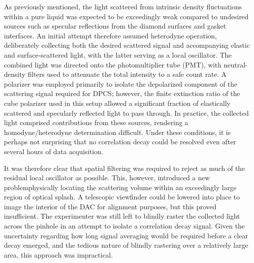 As previously mentioned, the light scattered from intrinsic density fluctuations within a pure liquid was expected to be exceedingly weak compared to undesired sources such as specular reflections from the diamond surfaces and gasket interfaces. An initial attempt therefore assumed heterodyne operation, deliberately collecting both the desired scattered signal and accompanying elastic and surface-scattered light, with the latter serving as a local oscillator. The combined light was directed onto the photomultiplier tube (PMT), with neutral-density filters used to attenuate the total intensity to a safe count rate. A polarizer was employed primarily to isolate the depolarized component of the scattering signal required for DPCS; however, the finite extinction ratio of the cube polarizer used in this setup allowed a significant fraction of elastically scattered and specularly reflected light to pass through. In practice, the collected light comprised contributions from these sources, rendering a homodyne/heterodyne determination difficult. Under these conditions, it is perhaps not surprising that no correlation decay could be resolved even after several hours of data acquisition.

It was therefore clear that spatial filtering was required to reject as much of the residual local oscillator as possible. This, however, introduced a new problem\textemdash physically locating the scattering volume within an exceedingly large region of optical splash. A telescopic viewfinder could be lowered into place to image the interior of the DAC for alignment purposes, but this proved insufficient. The experimenter was still left to blindly raster the collected light across the pinhole in an attempt to isolate a correlation decay signal. Given the uncertainty regarding how long signal averaging would be required before a clear decay emerged, and the tedious nature of blindly rastering over a relatively large area, this approach was impractical.


